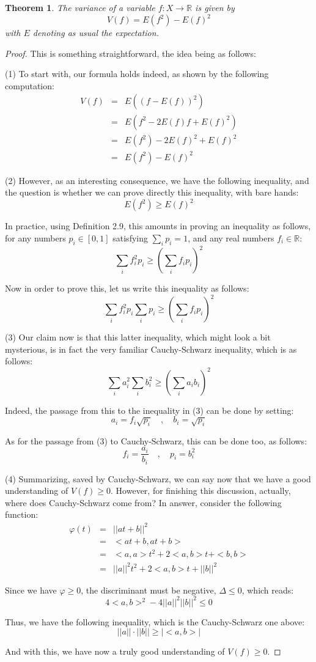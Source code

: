 \documentclass[12pt]{amsbook}
\newtheorem{theorem}{Theorem}[chapter]
\begin{document}
\begin{theorem}
The variance of a variable $f:X\to\mathbb R$ is given by
$$V(f)=E(f^2)-E(f)^2$$
with $E$ denoting as usual the expectation.
\end{theorem}

\begin{proof}
This is something straightforward, the idea being as follows:

\medskip

(1) To start with, our formula holds indeed, as shown by the following computation:
\begin{eqnarray*}
V(f)
&=&E\left((f-E(f))^2\right)\\
&=&E\left(f^2-2E(f)f+E(f)^2\right)\\
&=&E(f^2)-2E(f)^2+E(f)^2\\
&=&E(f^2)-E(f)^2
\end{eqnarray*}

(2) However, as an interesting consequence, we have the following inequality, and the question is whether we can prove directly this inequality, with bare hands:
$$E(f^2)\geq E(f)^2$$

In practice, using Definition 2.9, this amounts in proving an inequality as follows, for any numbers $p_i\in[0,1]$ satisfying $\sum_ip_i=1$, and any real numbers $f_i\in\mathbb R$:
$$\sum_if_i^2p_i\geq\left(\sum_if_ip_i\right)^2$$

Now in order to prove this, let us write this inequality as follows:
$$\sum_if_i^2p_i\sum_ip_i\geq\left(\sum_if_ip_i\right)^2$$

(3) Our claim now is that this latter inequality, which might look a bit mysterious, is in fact the very familiar Cauchy-Schwarz inequality, which is as follows:
$$\sum_ia_i^2\sum_ib_i^2\geq\left(\sum_ia_ib_i\right)^2$$

Indeed, the passage from this to the inequality in (3) can be done by setting:
$$a_i=f_i\sqrt{p_i}\quad,\quad b_i=\sqrt{p_i}$$

As for the passage from (3) to Cauchy-Schwarz, this can be done too, as follows:
$$f_i=\frac{a_i}{b_i}\quad,\quad p_i=b_i^2$$

(4) Summarizing, saved by Cauchy-Schwarz, we can say now that we have a good understanding of $V(f)\geq0$. However, for finishing this discussion, actually, where does Cauchy-Schwarz come from? In answer, consider the following function:
\begin{eqnarray*}
\varphi(t)
&=&||at+b||^2\\
&=&<at+b,at+b>\\
&=&<a,a>t^2+2<a,b>t+<b,b>\\
&=&||a||^2t^2+2<a,b>t+||b||^2
\end{eqnarray*}

Since we have $\varphi\geq0$, the discriminant must be negative, $\Delta\leq0$, which reads:
$$4<a,b>^2-4||a||^2||b||^2\leq 0$$

Thus, we have the following inequality, which is the Cauchy-Schwarz one above:
$$||a||\cdot ||b||\geq|<a,b>|$$

And with this, we have now a truly good understanding of $V(f)\geq0$.
\end{proof}
\end{document}
